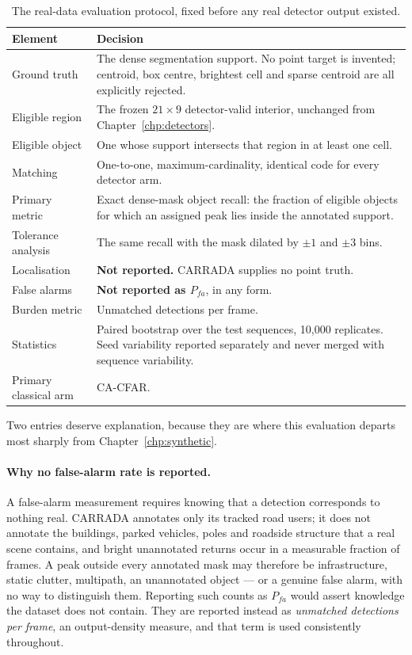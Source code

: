 \begin{table}[H]
\centering
\caption{The real-data evaluation protocol, fixed before any real detector output existed.}
\label{tab:prereg}
\begin{tabular}{@{}p{}p{}@{}}
\toprule
\textbf{Element} & \textbf{Decision} \\
\midrule
Ground truth & The dense segmentation support. No point target is invented; centroid, box centre,
brightest cell and sparse centroid are all explicitly rejected. \\
Eligible region & The frozen $21\times 9$ detector-valid interior, unchanged from
Chapter~\ref{chp:detectors}. \\
Eligible object & One whose support intersects that region in at least one cell. \\
Matching & One-to-one, maximum-cardinality, identical code for every detector arm. \\
Primary metric & Exact dense-mask object recall: the fraction of eligible objects for which an
assigned peak lies inside the annotated support. \\
Tolerance analysis & The same recall with the mask dilated by $\pm 1$ and $\pm 3$ bins. \\
Localisation & \textbf{Not reported.} CARRADA supplies no point truth. \\
False alarms & \textbf{Not reported as $P_{fa}$}, in any form. \\
Burden metric & Unmatched detections per frame. \\
Statistics & Paired bootstrap over the \RoneNseq{} test sequences, 10{,}000 replicates. Seed
variability reported separately and never merged with sequence variability. \\
Primary classical arm & CA-CFAR. \\
\bottomrule
\end{tabular}
\end{table}

Two entries deserve explanation, because they are where this evaluation departs most sharply from
Chapter~\ref{chp:synthetic}.

\paragraph{Why no false-alarm rate is reported.} A false-alarm measurement requires knowing that a
detection corresponds to nothing real. CARRADA annotates only its \CarradaTracks{} tracked road
users; it does not annotate the buildings, parked vehicles, poles and roadside structure that a real
scene contains, and bright unannotated returns occur in a measurable fraction of frames. A peak
outside every annotated mask may therefore be infrastructure, static clutter, multipath, an
unannotated object --- or a genuine false alarm, with no way to distinguish them. Reporting such
counts as $P_{fa}$ would assert knowledge the dataset does not contain. They are reported instead as
\emph{unmatched detections per frame}, an output-density measure, and that term is used consistently
throughout.

